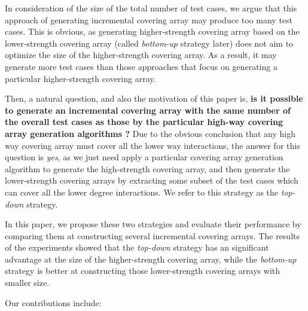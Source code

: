 \documentclass[conference]{IEEEtran}
\theoremstyle{definition}
\begin{document}

In consideration of the size of the total number of test cases, we argue that this approach of generating incremental covering array may produce too many test cases. This is obvious, as generating higher-strength covering array based on the lower-strength covering array (called \emph{bottom-up} strategy later) does not aim to optimize the size of the higher-strength covering array. As a result, it may generate more test cases than those approaches that focus on generating a particular higher-strength covering array.

Then, a natural question, and also the motivation of this paper is, \textbf{is it possible to generate an incremental covering array with the same number of the overall test cases as those by the particular high-way covering array generation algorithms ?}  Due to the obvious conclusion that any high way covering array must cover all the lower way interactions, the answer for this question is \emph{yes}, as we just need apply a particular covering array generation algorithm to generate the high-strength covering array, and then generate the lower-strength covering arrays by extracting some subset of the test cases which can cover all the lower degree interactions. We refer to this strategy as the \emph{top-down} strategy.

In this paper, we propose these two strategies and evaluate their performance by comparing them at constructing several incremental covering arrays. The results of the experiments showed that the \emph{top-down} strategy has an significant advantage at the size of the higher-strength covering array, while the \emph{bottom-up} strategy is better at constructing those lower-strength covering arrays with smaller size.

%


%
%
%
%
Our contributions include:
\end{document}
